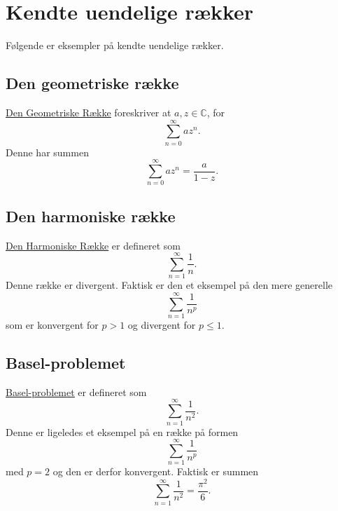 \section{Kendte uendelige rækker}
Følgende er eksempler på kendte uendelige rækker.

\subsection{Den geometriske række}
\underline{\hyperref[afs:georæk]{Den Geometriske Række}} foreskriver at $a, z \in \mathbb{C}$, for
\[ 
\sum_{n = 0}^{\infty}  a z^n 
.\]
Denne har summen
\[ 
\sum_{n = 0}^{\infty} a z^{n} = \frac{a}{1-z}
.\]


\subsection{Den harmoniske række}
\underline{\hyperref[afs:harræk]{Den Harmoniske Række}} er defineret som
\[ 
\sum_{n = 1}^{\infty} \frac{1}{n}
.\]
Denne række er divergent. Faktisk er den et eksempel på den mere generelle
\[ 
\sum_{n = 1}^{\infty} \frac{1}{n^{p}}
\]
som er konvergent for $p > 1$ og divergent for $p \leq 1$.

\subsection{Basel-problemet}
\underline{\hyperref[afs:baspro]{Basel-problemet}} er defineret som
\[ 
\sum_{n = 1}^{\infty} \frac{1}{n^2}
.\]
Denne er ligeledes et eksempel på en række på formen
\[ 
\sum_{n = 1}^{\infty} \frac{1}{n^{p}}
\]
med $p = 2$ og den er derfor konvergent. Faktisk er summen
\[ 
\sum_{n = 1}^{\infty} \frac{1}{n^2} = \frac{\pi^2}{6}
.\]
